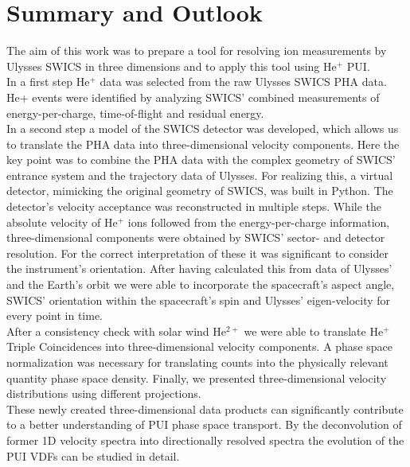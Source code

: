 
\chapter{Summary and Outlook} %

\label{chap:concl} %



The aim of this work was to prepare a tool for resolving ion measurements by Ulysses SWICS in three dimensions and to apply this tool using $\mathrm{He^+}$ PUI.\\
In a first step $\mathrm{He^+}$ data was selected from the raw Ulysses SWICS PHA data.
He+ events were identified by analyzing SWICS' combined measurements of energy-per-charge, time-of-flight and residual energy.\\
In a second step a model of the SWICS detector was developed, which allows us to translate the PHA data into three-dimensional velocity components.
Here the key point was to combine the PHA data with the complex geometry of SWICS' entrance system and the trajectory data of Ulysses. For realizing this, a virtual detector, mimicking the original geometry of SWICS, was built in Python. 
The detector's velocity acceptance was reconstructed in multiple steps. While the absolute velocity of $\mathrm{He^+}$ ions followed from the energy-per-charge information, three-dimensional components were obtained by SWICS' sector- and detector resolution. For the correct interpretation of these it was significant to consider the instrument's orientation. After having calculated this from data of Ulysses' and the Earth's orbit we were able to incorporate the spacecraft's aspect angle, SWICS' orientation within the spacecraft's spin and Ulysses' eigen-velocity for every point in time.\\
After a consistency check with solar wind $\mathrm{He^{2+}}$ we were able to translate $\mathrm{He^+}$ Triple Coincidences into three-dimensional velocity components.
A phase space normalization was necessary for translating counts into the physically relevant quantity phase space density.
Finally, we presented three-dimensional velocity distributions using different projections. 
\\
These newly created three-dimensional data products can significantly contribute to a better understanding of PUI phase space transport. By the deconvolution of former 1D velocity spectra into directionally resolved spectra the evolution of the PUI VDFs can be studied in detail.
